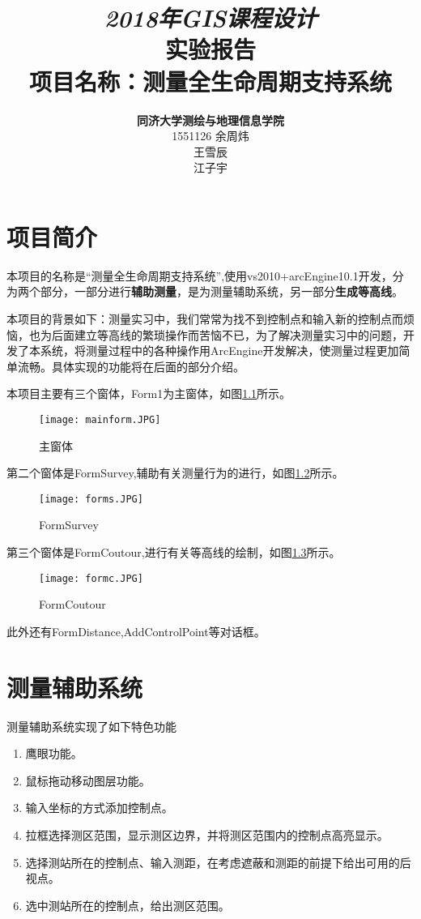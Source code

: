 \documentclass[twoside,color=blue,mathpazo,titlestyle=hang,12pt]{elegantbook}
\title{{\Huge\emph{2018年GIS课程设计}\\实验报告}\\{\Large 项目名称：测量全生命周期支持系统}}
\author
{
\Large\textbf{同济大学测绘与地理信息学院} \\
1551126 余周炜 \\
王雪辰 \\
江子宇
}
\date{}
\numberwithin{equation}{section}
\begin{document}
\frontmatter

\maketitle


\tableofcontents

\mainmatter

\chapter{项目简介}

本项目的名称是“测量全生命周期支持系统”,使用vs2010+arcEngine10.1开发，分为两个部分，一部分进行\textbf{辅助测量}，是为测量辅助系统，另一部分\textbf{生成等高线}。

本项目的背景如下：测量实习中，我们常常为找不到控制点和输入新的控制点而烦恼，也为后面建立等高线的繁琐操作而苦恼不已，为了解决测量实习中的问题，开发了本系统，将测量过程中的各种操作用ArcEngine开发解决，使测量过程更加简单流畅。具体实现的功能将在后面的部分介绍。


本项目主要有三个窗体，Form1为主窗体，如图\ref{fig:mainform}所示。
\begin{figure}[htbp]
\caption{主窗体}
\label{fig:mainform}
\centering
\texttt{[image: mainform.JPG]}
\end{figure}

第二个窗体是FormSurvey,辅助有关测量行为的进行，如图\ref{fig:forms}所示。
\begin{figure}[htbp]
\caption{FormSurvey}
\label{fig:forms}
\centering
\texttt{[image: forms.JPG]}
\end{figure}

第三个窗体是FormCoutour,进行有关等高线的绘制，如图\ref{fig:formc}所示。
\begin{figure}[htbp]
\caption{FormCoutour}
\label{fig:formc}
\centering
\texttt{[image: formc.JPG]}
\end{figure}

此外还有FormDistance,AddControlPoint等对话框。

\chapter{测量辅助系统}

测量辅助系统实现了如下特色功能
\begin{enumerate}   
\item 鹰眼功能。
\item 鼠标拖动移动图层功能。
\item 输入坐标的方式添加控制点。
\item 拉框选择测区范围，显示测区边界，并将测区范围内的控制点高亮显示。
\item 选择测站所在的控制点、输入测距，在考虑遮蔽和测距的前提下给出可用的后视点。
\item 选中测站所在的控制点，给出测区范围。
\end{enumerate}
\end{document}

